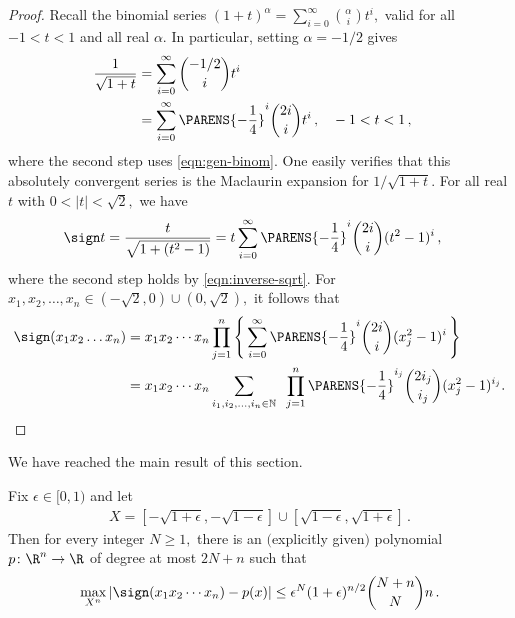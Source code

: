 \begin{proof}
Recall the binomial series 
$(1+t)^{\alpha} = \sum_{i=0}^\infty {\alpha \choose i}
t^i,$
valid for all $-1<t<1$
and all real $\alpha$. In particular, setting
$\alpha=-1/2$ gives
\begin{align}
\frac{1}{\sqrt{1+t}} 
   &= \sum_{i=0}^\infty {-1/2 \choose i} t^i \nonumber \\
   &= \sum_{i=0}^\infty \PARENS{-\frac14}^i {2i\choose i} t^i\,, 
   		&& -1<t<1\,,
\label{eqn:inverse-sqrt}
\end{align}
where the second step uses \eqref{eqn:gen-binom}. One easily verifies that this absolutely 
convergent series is the Maclaurin
expansion for $1/\sqrt{1+t}$. For all real $t$ with
$0<|t|<\sqrt 2,$ we have
\begin{align}
 \sign t &= \frac t{\sqrt{1 + (t^2-1)}}
  = t\sum_{i=0}^\infty \PARENS{-\frac14}^i {2i \choose i} (t^2-1)^i\,,
  \label{eqn:sign-approx-maclaurin}
\end{align}
where the second step holds by
\eqref{eqn:inverse-sqrt}. For 
$x_1,x_2,\dots,x_n\in(-\sqrt 2,0)\cup(0,\sqrt 2),$ 
it follows that
\begin{align*}
\sign(x_1x_2\dots x_n)
  &= x_1x_2\cdots x_n \prod_{j=1}^n \left\{\,\sum_{i=0}^\infty 
       \PARENS{-\frac14}^i{2i \choose i} (x_j^2-1)^i
	   \,\right\}  \\
  &= x_1x_2\cdots x_n \sum_{i_1,i_2,\dots,i_n\in\mathbb N}
  \;\; \prod_{j=1}^n
  \PARENS{-\frac14}^{i_j}{2i_j\choose i_j}(x_j^2-1)^{i_j}. 
  \qedhere
\end{align*}
\end{proof}


We have reached the main result of this section.

\begin{theorem}
\label{thm:parity-robust}
Fix $\epsilon\in[0,1)$ and let
\begin{align*}
X=[-\sqrt{1+\epsilon},-\sqrt{1-\epsilon}]\cup
         [\sqrt{1-\epsilon},\sqrt{1+\epsilon}]\,. 
\end{align*}
Then for every integer $N\geq1,$ there is an
$($explicitly given$)$
polynomial $p\colon\R^n\to\R$ of degree at most
$2N+n$ such that 
\begin{align}
   \max_{X^n}|\sign(x_1x_2\cdots x_n)-p(x)| \leq
   \epsilon^N(1+\epsilon)^{n/2}{N+n\choose N}n\,.
   \label{eqn:parity-error-bound}
\end{align}
\end{theorem}


